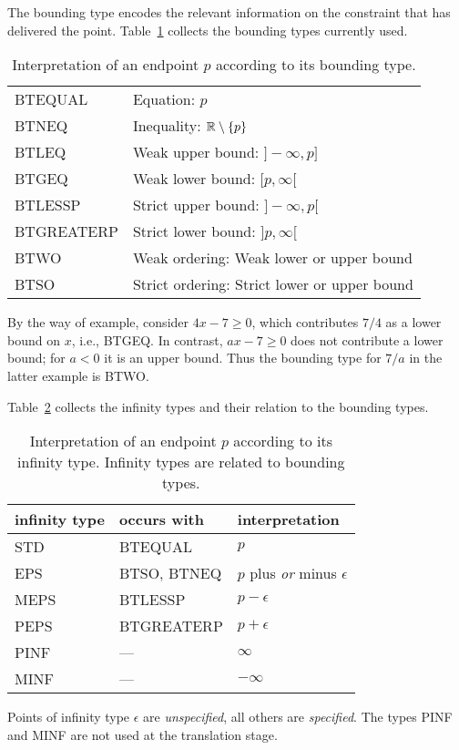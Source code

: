 The bounding type encodes the relevant information on the constraint
that has delivered the point. Table~\ref{bttab} collects the bounding
types currently used.
%
\begin{table}[t]
\begin{center}
\begin{tabular}{ll}
\hline
BTEQUAL & Equation: $p$\\
BTNEQ & Inequality: ${\Bbb R}\setminus\{p\}$\\
BTLEQ & Weak upper bound: $]-\infty,p]$\\
BTGEQ & Weak lower bound: $[p,\infty[$\\
BTLESSP & Strict upper bound: $]-\infty,p[$\\
BTGREATERP & Strict lower bound: $]p,\infty[$\\
BTWO & Weak ordering: Weak lower or upper bound\\
BTSO & Strict ordering: Strict lower or upper bound\\
\hline
\end{tabular}
\end{center}
\caption{Interpretation of an endpoint $p$ according to its bounding
type.\label{bttab}}
\end{table}
%
By the way of example, consider $4x-7\geq0$, which contributes $7/4$
as a lower bound on $x$, i.e., BTGEQ. In contrast, $ax-7\geq0$ does
not contribute a lower bound; for $a<0$ it is an upper bound. Thus the
bounding type for $7/a$ in the latter example is BTWO.

Table~\ref{ittab} collects the infinity types and their relation to
the bounding types.
%
\begin{table}[t]
\begin{center}
\begin{tabular}{lll}
\hline
infinity type & occurs with & interpretation\\
\hline
STD & BTEQUAL & $p$\\
EPS & BTSO, BTNEQ & $p$ plus {\em or} minus $\epsilon$\\
MEPS & BTLESSP & $p-\epsilon$\\
PEPS & BTGREATERP & $p+\epsilon$\\
PINF & --- & $\infty$\\
MINF & --- & $-\infty$\\
\hline
\end{tabular}
\end{center}
\caption{Interpretation of an endpoint $p$ according to its infinity
type. Infinity types are related to bounding types.\label{ittab}}
\end{table}
%
Points of infinity type $\epsilon$ are {\em unspecified}, all others
are {\em specified}. The types PINF and MINF are not used at the
translation stage.


